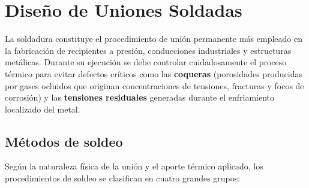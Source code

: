 \section{Diseño de Uniones Soldadas}

La soldadura constituye el procedimiento de unión permanente más empleado en la fabricación de recipientes a presión, conducciones industriales y estructuras metálicas. Durante su ejecución se debe controlar cuidadosamente el proceso térmico para evitar defectos críticos como las \textbf{coqueras} (porosidades producidas por gases ocluidos que originan concentraciones de tensiones, fracturas y focos de corrosión) y las \textbf{tensiones residuales} generadas durante el enfriamiento localizado del metal.

\subsection{Métodos de soldeo}
Según la naturaleza física de la unión y el aporte térmico aplicado, los procedimientos de soldeo se clasifican en cuatro grandes grupos:
